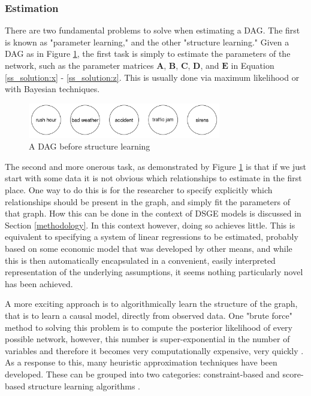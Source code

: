 \documentclass{article}
\begin{document}
\subsubsection{Estimation} \label{dag_estimation}

There are two fundamental problems to solve when estimating a DAG. The first is known as "parameter learning," and the other "structure learning." Given a DAG as in Figure \ref{dag2}, the first task is simply to estimate the parameters of the network, such as the parameter matrices $\mathbf{A}$, $\mathbf{B}$, $\mathbf{C}$, $\mathbf{D}$, and $\mathbf{E}$ in Equation \ref{ss_solution:x} - \ref{ss_solution:z}. This is usually done via maximum likelihood or with Bayesian techniques.

\begin{figure}
  \centering
  \includegraphics[width=0.75\textwidth]{images/trafficjam_unfit.png}
  \caption{A DAG before structure learning}
  \label{dag2}
\end{figure}

The second and more onerous task, as demonstrated by Figure \ref{dag2} is that if we just start with some data it is not obvious which relationships to estimate in the first place. One way to do this is for the researcher to specify explicitly which relationships should be present in the graph, and simply fit the parameters of that graph. How this can be done in the context of DSGE models is discussed in Section \ref{methodology}. In this context however, doing so achieves little. This is equivalent to specifying a system of linear regressions to be estimated, probably based on some economic model that was developed by other means, and while this is then automatically encapsulated in a convenient, easily interpreted representation of the underlying assumptions, it seems nothing particularly novel has been achieved. 

A more exciting approach is to algorithmically learn the structure of the graph, that is to learn a causal model, directly from observed data. One "brute force" method to solving this problem is to compute the posterior likelihood of every possible network, however, this number is super-exponential in the number of variables and therefore it becomes very computationally expensive, very quickly \parencite{chickering1996learning}. As a response to this, many heuristic approximation techniques have been developed. These can be grouped into two categories: constraint-based and score-based structure learning algorithms \parencite{spirtes1991algorithm} \parencite{verma1991equivalence}. 
\end{document}
